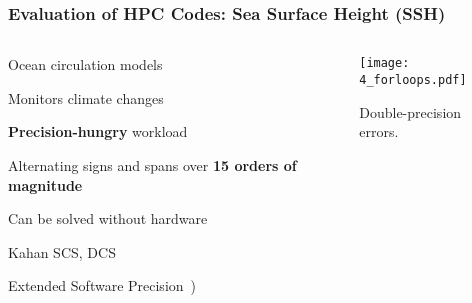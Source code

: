 \begin{frame}
	\frametitle{Evaluation of HPC Codes: Sea Surface Height (SSH)}


\begin{columns}

\begin{column}{0.5\textwidth}
    \begin{myitemize}
        \item<1-> Ocean circulation models
	\item<1-> Monitors climate changes~\cite{barrick_ocean}
	\item<1-> \textbf{Precision-hungry} workload
	\item<1-> Alternating signs and spans over \textbf{15 orders of magnitude}
	\item<1-> Can be solved without hardware
	\item<1-> Kahan SCS, DCS~\cite{kahan_pracniques_1965}
	\item<1-> Extended Software Precision~\cite{bailey_high-precision_2009})
    \end{myitemize}
\end{column}
\begin{column}{0.5\textwidth}
    \begin{figure}
	    \vspace{2mm}
        \texttt{[image: 4\_forloops.pdf]}
	    \vspace{-11mm}
	    \caption{Double-precision errors.}
    \end{figure}
\end{column}

\end{columns}


\normalsize


\end{frame}

